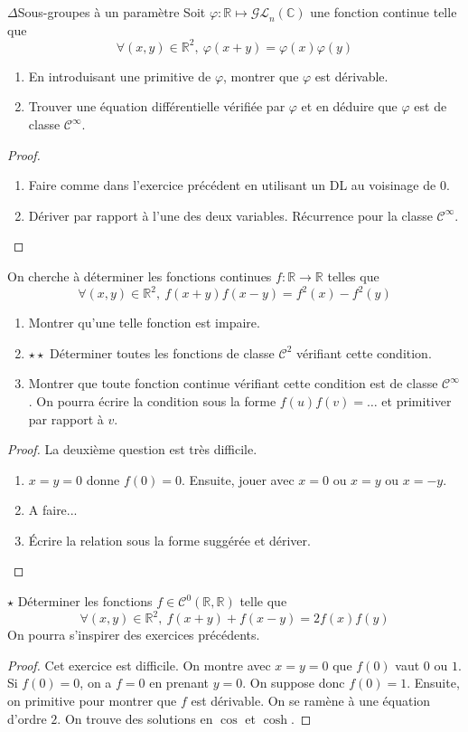 \documentclass[french,a4paper]{article}
\newcommand{\R}{\mathbb{R}}
\newcommand{\C}{\mathbb{C}}
\theoremstyle{plain}
\theoremstyle{definition}
\theoremstyle{remark}
\begin{document}
\begin{ex}[Moulin.FV.33]{$\Delta$Sous-groupes à un paramètre}
	Soit $\varphi:\R\mapsto\mathcal{GL}_n(\C)$ une fonction continue telle que $$\forall (x,y)\in\R^2,\ \varphi(x+y)=\varphi(x)\varphi(y)$$
	\begin{enumerate}
		\item En introduisant une primitive de $\varphi$, montrer que $\varphi$ est dérivable.
		\item Trouver une équation différentielle vérifiée par $\varphi$ et en déduire que $\varphi$ est de classe $\mathcal{C}^\infty$.
	\end{enumerate}
\end{ex}
\begin{proof}
	\begin{enumerate}
		\item Faire comme dans l'exercice précédent en utilisant un DL au voisinage de $0$.
		\item Dériver par rapport à l'une des deux variables. Récurrence pour la classe $\mathcal{C}^\infty$.
	\end{enumerate}
\end{proof}

\begin{ex}[Moulin.FV.34]{}
	On cherche à déterminer les fonctions continues $f:\R\to\R$ telles que $$\forall (x,y)\in\R^2,\ f(x+y)f(x-y)=f^2(x)-f^2(y)$$
	\begin{enumerate}
		\item Montrer qu'une telle fonction est impaire.
		\item $\star\star$ Déterminer toutes les fonctions de classe $\mathcal{C}^2$ vérifiant cette condition.
		\item Montrer que toute fonction continue vérifiant cette condition est de classe $\mathcal{C}^\infty$. On pourra écrire la condition sous la forme $f(u)f(v)=\ldots$ et primitiver par rapport à $v$.
	\end{enumerate}
\end{ex}
\begin{proof}
	La deuxième question est très difficile.
	\begin{enumerate}
		\item $x=y=0$ donne $f(0)=0$. Ensuite, jouer avec $x=0$ ou $x=y$ ou $x=-y$.
		\item A faire...
		\item Écrire la relation sous la forme suggérée et dériver.
	\end{enumerate}
\end{proof}

\begin{ex}[Moulin.FV.35]{$\star$}
	Déterminer les fonctions $f\in\mathcal{C}^0(\R,\R)$ telle que $$\forall (x,y)\in\R^2,\ f(x+y)+f(x-y)=2f(x)f(y)$$ On pourra s'inspirer des exercices précédents.
\end{ex}
\begin{proof}
	Cet exercice est difficile. On montre avec $x=y=0$ que $f(0)$ vaut $0$ ou $1$. Si $f(0)=0$, on a $f=0$ en prenant $y=0$. On suppose donc $f(0)=1$. Ensuite, on primitive pour montrer que $f$ est dérivable. On se ramène à une équation d'ordre $2$. On trouve des solutions en $\cos$ et $\cosh$.
\end{proof}
\end{document}
